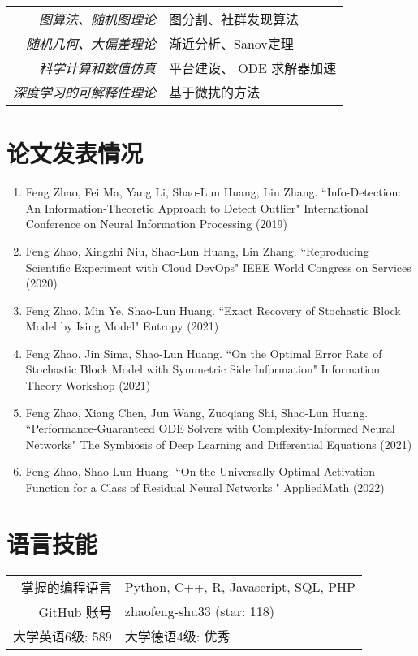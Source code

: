 \documentclass[12pt]{moderncv}
\begin{document}
\begin{tabular}{rl}
  \textit{图算法、随机图理论} & 图分割、社群发现算法\\
   \textit{随机几何、大偏差理论}& 渐近分析、Sanov定理\\
   \textit{科学计算和数值仿真} & 平台建设、 ODE 求解器加速\\ 
    \textit{深度学习的可解释性理论} & 基于微扰的方法\\
 \end{tabular}
 \section{论文发表情况}
 \begin{enumerate}
     \item Feng Zhao, Fei Ma, Yang Li, Shao-Lun Huang, Lin Zhang. ``Info-Detection: An Information-Theoretic Approach to Detect Outlier" International Conference on Neural Information Processing (2019)
     \item Feng Zhao, Xingzhi Niu, Shao-Lun Huang, Lin Zhang. ``Reproducing Scientific Experiment with Cloud DevOps" IEEE World Congress on Services (2020)
     \item Feng Zhao, Min Ye, Shao-Lun Huang. ``Exact Recovery of Stochastic Block Model by Ising Model" Entropy (2021)
     \item Feng Zhao, Jin Sima, Shao-Lun Huang. ``On the Optimal Error Rate of Stochastic Block Model with Symmetric Side Information" Information Theory Workshop (2021)
     \item Feng Zhao, Xiang Chen, Jun Wang, Zuoqiang Shi, Shao-Lun Huang. ``Performance-Guaranteed ODE Solvers with Complexity-Informed Neural Networks" The Symbiosis of Deep Learning and Differential Equations (2021)
     \item Feng Zhao, Shao-Lun Huang. ``On the Universally Optimal Activation Function for a Class of Residual Neural Networks." AppliedMath (2022)
 \end{enumerate}
 
\section{语言技能}
\begin{tabular}{rl}
    掌握的编程语言
    & Python, C++,
    R, Javascript, SQL, PHP \\
    GitHub 账号 & zhaofeng-shu33 (star: 118) \\
    大学英语6级: 589 & 大学德语4级: 优秀\\
    \end{tabular}
\end{document}
